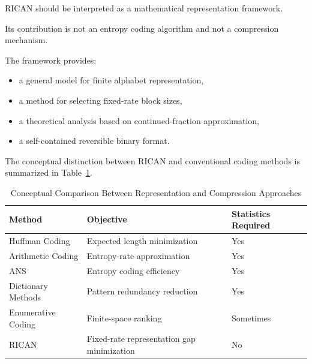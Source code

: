 \documentclass[onecolumn]{IEEEtran}
\begin{document}
RICAN should be interpreted as a mathematical representation
framework.

Its contribution is not an entropy coding algorithm and not a
compression mechanism.

The framework provides:

\begin{itemize}

\item a general model for finite alphabet representation,

\item a method for selecting fixed-rate block sizes,

\item a theoretical analysis based on continued-fraction approximation,

\item a self-contained reversible binary format.

\end{itemize}

The conceptual distinction between RICAN and conventional coding
methods is summarized in Table~\ref{tab:comparison}.

\begin{table}[!t]
\caption{Conceptual Comparison Between Representation and Compression
Approaches}
\label{tab:comparison}
\centering
\begin{tabular}{lll}
\toprule
Method & Objective & Statistics Required\\
\midrule
Huffman Coding &
Expected length minimization &
Yes\\

Arithmetic Coding &
Entropy-rate approximation &
Yes\\

ANS &
Entropy coding efficiency &
Yes\\

Dictionary Methods &
Pattern redundancy reduction &
Yes\\

Enumerative Coding &
Finite-space ranking &
Sometimes\\

RICAN &
Fixed-rate representation gap minimization &
No\\

\bottomrule
\end{tabular}
\end{table}

\end{document}
